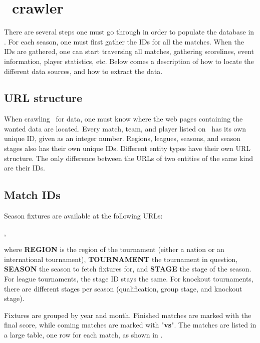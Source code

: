 \section{\whoscoredplain\ crawler}

There are several steps one must go through in order to populate the database in . For each season, one must first gather the IDs for all the matches. When the IDs are gathered, one can start traversing all matches, gathering scorelines, event information, player statistics, etc. Below comes a description of how to locate the different data sources, and how to extract the data.


\subsection{URL structure}

When crawling \whoscored\  for data, one must know where the web pages containing the wanted data are located. Every match, team, and player listed on \whoscored\ has its own unique ID, given as an integer number. Regions, leagues, seasons, and season stages also has their own unique IDs. Different entity types have their own URL structure. The only difference between the URLs of two entities of the same kind are their IDs.


\subsection{Match IDs}

Season fixtures are available at the following URLs:

,

where \textbf{REGION} is the region of the tournament (either a nation or an international tournament), \textbf{TOURNAMENT} the tournament in question, \textbf{SEASON} the season to fetch fixtures for, and \textbf{STAGE} the stage of the season. For league tournaments, the stage ID stays the same. For knockout tournaments, there are different stages per season (qualification, group stage, and knockout stage).

Fixtures are grouped by year and month. Finished matches are marked with the final score, while coming matches are marked with "\textbf{vs}". The matches are listed in a large table, one row for each match, as shown in .

